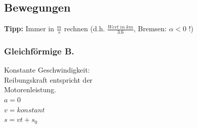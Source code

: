 \subsection{Bewegungen}
\textbf{Tipp:} Immer in $\frac{m}{s}$ rechnen (d.h. $\frac{Wert \; in \; km}{3.6}$, 	Bremsen: $\alpha < 0$ !)
\begin{multicols}{3}
	\subsubsection{Gleichförmige B.}
	Konstante Geschwindigkeit: \\
	Reibungskraft entspricht der \\
	Motorenleistung. \\
	$a = 0$ \\
	$v = konstant$\\
	$s = vt + s_0$ \\
	\\
	\\
\columnbreak

\end{multicols}
